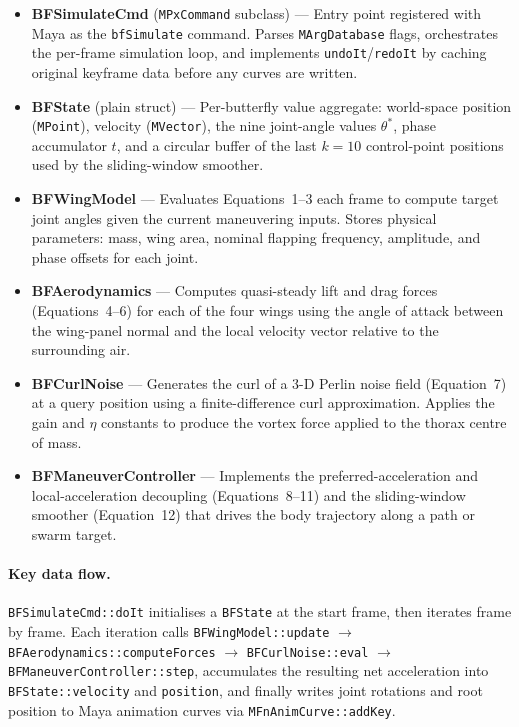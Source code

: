 \documentclass[12pt]{article}
\begin{document}
\begin{itemize}
  \item \textbf{BFSimulateCmd} (\texttt{MPxCommand} subclass) --- Entry point
    registered with Maya as the \texttt{bfSimulate} command. Parses
    \texttt{MArgDatabase} flags, orchestrates the per-frame simulation loop,
    and implements \texttt{undoIt}/\texttt{redoIt} by caching original keyframe
    data before any curves are written.

  \item \textbf{BFState} (plain struct) --- Per-butterfly value aggregate: world-space
    position (\texttt{MPoint}), velocity (\texttt{MVector}), the nine joint-angle
    values $\theta^*$, phase accumulator $t$, and a circular buffer of the last
    $k=10$ control-point positions used by the sliding-window smoother.

  \item \textbf{BFWingModel} --- Evaluates Equations~1--3 each frame to compute
    target joint angles given the current maneuvering inputs. Stores
    physical parameters: mass, wing area, nominal flapping frequency,
    amplitude, and phase offsets for each joint.

  \item \textbf{BFAerodynamics} --- Computes quasi-steady lift and drag forces
    (Equations~4--6) for each of the four wings using the angle of attack between
    the wing-panel normal and the local velocity vector relative to the surrounding
    air.

  \item \textbf{BFCurlNoise} --- Generates the curl of a 3-D Perlin noise field
    (Equation~7) at a query position using a finite-difference curl approximation.
    Applies the gain and $\eta$ constants to produce the vortex
    force applied to the thorax centre of mass.

  \item \textbf{BFManeuverController} --- Implements the preferred-acceleration and
    local-acceleration decoupling (Equations~8--11) and the sliding-window smoother
    (Equation~12) that drives the body trajectory along a path or swarm target.
\end{itemize}

\paragraph{Key data flow.}
\texttt{BFSimulateCmd::doIt} initialises a \texttt{BFState} at the start frame,
then iterates frame by frame. Each iteration calls \texttt{BFWingModel::update}
$\to$ \texttt{BFAerodynamics::computeForces} $\to$ \texttt{BFCurlNoise::eval}
$\to$ \texttt{BFManeuverController::step}, accumulates the resulting net
acceleration into \texttt{BFState::velocity} and \texttt{position}, and finally
writes joint rotations and root position to Maya animation curves via
\texttt{MFnAnimCurve::addKey}.
\end{document}

